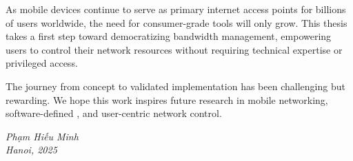 As mobile devices continue to serve as primary internet access points for billions of users worldwide, the need for consumer-grade \qos tools will only grow. This thesis takes a first step toward democratizing bandwidth management, empowering users to control their network resources without requiring technical expertise or privileged access.

The journey from concept to validated implementation has been challenging but rewarding. We hope this work inspires future research in mobile networking, software-defined \qos, and user-centric network control.

\vspace{1cm}

\begin{flushright}
\textit{Phạm Hiếu Minh}\\
\textit{Hanoi, 2025}
\end{flushright}
